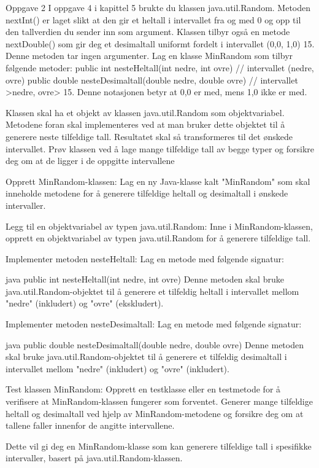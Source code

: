 Oppgave 2
I oppgave 4 i kapittel 5 brukte du klassen java.util.Random. Metoden nextInt() er laget slikt at 
den gir et heltall i intervallet fra og med 0 og opp til den tallverdien du sender inn som 
argument. 
Klassen tilbyr også en metode nextDouble() som gir deg et desimaltall uniformt 
fordelt i intervallet (0,0, 1,0) 15. 
Denne metoden tar ingen argumenter.
Lag en klasse MinRandom som tilbyr følgende metoder:
public int nesteHeltall(int nedre, int ovre) // intervallet (nedre, ovre)
public double nesteDesimaltall(double nedre, double ovre) 
// intervallet >nedre, ovre> 15. 
Denne notasjonen betyr at 0,0 er med, mens 1,0 ikke er med.

Klassen skal ha et objekt av klassen java.util.Random som objektvariabel. 
Metodene foran skal implementeres ved at man bruker dette objektet til å 
generere neste tilfeldige tall. 
Resultatet skal så transformeres til det ønskede intervallet.
Prøv klassen ved å lage mange tilfeldige tall av begge typer 
og forsikre deg om at de ligger i de oppgitte intervallene



Opprett MinRandom-klassen:
Lag en ny Java-klasse kalt "MinRandom" som skal inneholde metodene for å generere 
tilfeldige heltall og desimaltall i ønskede intervaller.

Legg til en objektvariabel av typen java.util.Random:
Inne i MinRandom-klassen, opprett en objektvariabel av typen java.util.Random for 
å generere tilfeldige tall.

Implementer metoden nesteHeltall:
Lag en metode med følgende signatur:

java
public int nesteHeltall(int nedre, int ovre)
Denne metoden skal bruke java.util.Random-objektet til å generere et
tilfeldig heltall i intervallet mellom "nedre" (inkludert) og "ovre" (ekskludert).

Implementer metoden nesteDesimaltall:
Lag en metode med følgende signatur:

java
public double nesteDesimaltall(double nedre, double ovre)
Denne metoden skal bruke java.util.Random-objektet til å generere et 
tilfeldig desimaltall i intervallet mellom "nedre" (inkludert) og "ovre" (inkludert).

Test klassen MinRandom:
Opprett en testklasse eller en testmetode for å verifisere at MinRandom-klassen fungerer
som forventet. Generer mange tilfeldige heltall og desimaltall ved hjelp av
 MinRandom-metodene og forsikre deg om at tallene faller innenfor de angitte intervallene.

Dette vil gi deg en MinRandom-klasse som kan generere tilfeldige tall i spesifikke
intervaller, basert på java.util.Random-klassen.